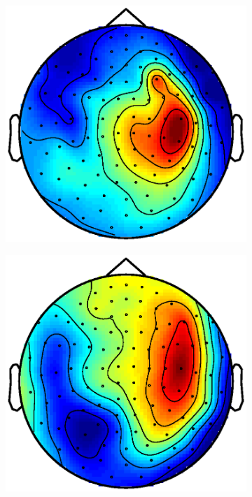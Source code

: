 \documentclass[doc,a4paper,12pt]{apa6}
\begin{document}
\begin{figure}
  \centering
  \captionsetup{justification=centering}
  \begin{subfigure}[c]{0.47\textwidth}
    \includegraphics[width=\textwidth]{ergebnisse/topoplot/pa07a1_raw.eps}
    \label{img:topolot:pa07a1}
  \end{subfigure}\hspace*{0.04\textwidth}
  \begin{subfigure}[c]{0.47\textwidth}
    \includegraphics[width=\textwidth]{ergebnisse/topoplot/pa10a1_raw.eps}

\end{subfigure}
\end{figure}
\end{document}

